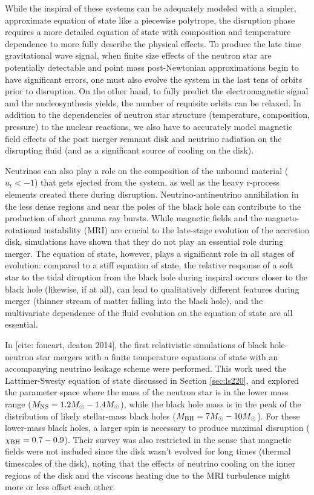 While the inspiral of these systems can be adequately modeled with a simpler, approximate equation of state like a piecewise polytrope, the disruption phase requires a more detailed equation of state with composition and temperature dependence to more fully describe the physical effects.  
To produce the late time gravitational wave signal, when finite size effects of the neutron star are potentially detectable and point mass post-Newtonian approximations begin to have significant errors, one must also evolve the system in the last tens of orbits prior to disruption.  
On the other hand, to fully predict the electromagnetic signal and the nucleosynthesis yields, the number of requisite orbits can be relaxed.  
In addition to the dependencies of neutron star structure (temperature, composition, pressure) to the nuclear reactions, we also have to accurately model magnetic field effects of the post merger remnant disk and neutrino radiation on the disrupting fluid (and as a significant source of cooling on the disk).

Neutrinos can also play a role on the composition of the unbound material ($u_t < -1$) that gets ejected from the system, as well as the heavy r-process elements created there during disruption. 
Neutrino-antineutrino annihilation in the less dense regions and near the poles of the black hole can contribute to the production of short gamma ray bursts.  
While magnetic fields and the magneto-rotational instability (MRI) are crucial to the late-stage evolution of the accretion disk, simulations have shown that they do not play an essential role during merger.  
The equation of state, however, plays a significant role in all stages of evolution: compared to a stiff equation of state, the relative response of a soft star to the tidal diruption from the black hole during inspiral occurs closer to the black hole (likewise, if at all), can lead to qualitatively different features during merger (thinner stream of matter falling into the black hole), and the multivariate dependence of the fluid evolution on the equation of state are all essential.

In [cite: foucart, deaton 2014], the first relativistic simulations of black hole-neutron star mergers with a finite temperature equations of state with an accompanying neutrino leakage scheme were performed.  
This work used the Lattimer-Swesty equation of state discussed in Section \ref{sec:ls220}, and explored the parameter space where the mass of the neutron star is in the lower mass range ($M_{\rm NS} = 1.2 M_\odot - 1.4 M_\odot$), while the black hole mass is in the peak of the distribution of likely stellar-mass black holes ($M_{\rm BH} = 7 M_\odot - 10 M_\odot$). 
For these lower-mass black holes, a larger spin is necessary to produce maximal disruption ($\chi_{\rm BH} = 0.7 - 0.9$).  
Their survey was also restricted in the sense that magnetic fields were not included since the disk wasn't evolved for long times (thermal timescales of the disk), noting that the effects of neutrino cooling on the inner regions of the disk and the viscous heating due to the MRI turbulence might more or less offset each other.

